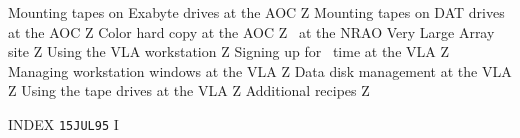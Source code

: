  {Mounting tapes on Exabyte drives at the
                                                      AOC}     {Z}
 {Mounting tapes on DAT drives at the AOC}   {Z}
   {Color hard copy at the AOC}                {Z}
     {\AIPS\ at the NRAO Very Large Array site}  {Z}
   {Using the VLA workstation}                 {Z}
 {Signing up for \AIPS\ time at the VLA}     {Z}
 {Managing workstation windows at the VLA}   {Z}
 {Data disk management at the VLA}           {Z}
   {Using the tape drives at the VLA}          {Z}
     {Additional recipes}                        {Z}

       {INDEX%
}                    {{\tt 15JUL95}\hskip 0.6cm I}



